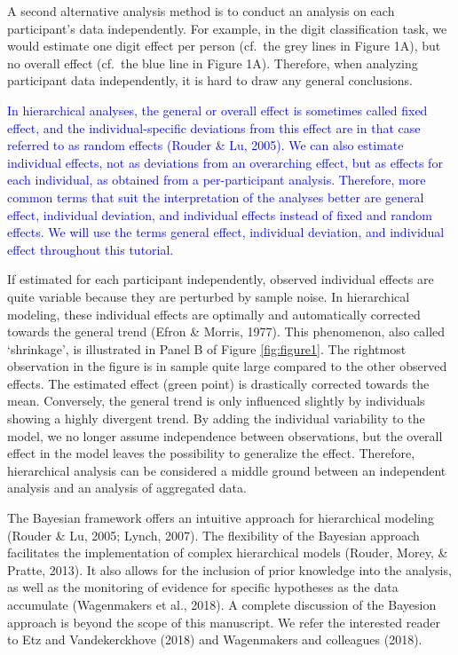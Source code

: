 \documentclass[
  english,
  doc,floatsintext]{apa6}
\begin{document}
A second alternative analysis method is to conduct an analysis on each participant's data independently. For example, in the digit classification task, we would estimate one digit effect per person (cf.~the grey lines in Figure 1A), but no overall effect (cf.~the blue line in Figure 1A). Therefore, when analyzing participant data independently, it is hard to draw any general conclusions.

\textcolor{blue}{In hierarchical analyses, the general or overall effect is sometimes called fixed effect, and the individual-specific deviations from this effect are in that case referred to as random effects (Rouder \& Lu, 2005). We can also estimate individual effects, not as deviations from an overarching effect, but as effects for each individual, as obtained from a per-participant analysis. Therefore, more common terms that suit the interpretation of the analyses better are general effect, individual deviation, and individual effects instead of fixed and random effects. We will use the terms general effect, individual deviation, and individual effect throughout this tutorial.}

If estimated for each participant independently, observed individual effects are quite variable because they are perturbed by sample noise. In hierarchical modeling, these individual effects are optimally and automatically corrected towards the general trend (Efron \& Morris, 1977). This phenomenon, also called `shrinkage', is illustrated in Panel B of Figure \ref{fig:figure1}. The rightmost observation in the figure is in sample quite large compared to the other observed effects. The estimated effect (green point) is drastically corrected towards the mean. Conversely, the general trend is only influenced slightly by individuals showing a highly divergent trend. By adding the individual variability to the model, we no longer assume independence between observations, but the overall effect in the model leaves the possibility to generalize the effect. Therefore, hierarchical analysis can be considered a middle ground between an independent analysis and an analysis of aggregated data.

The Bayesian framework offers an intuitive approach for hierarchical modeling (Rouder \& Lu, 2005; Lynch, 2007). The flexibility of the Bayesian approach facilitates the implementation of complex hierarchical models (Rouder, Morey, \& Pratte, 2013). It also allows for the inclusion of prior knowledge into the analysis, as well as the monitoring of evidence for specific hypotheses as the data accumulate (Wagenmakers et al., 2018). A complete discussion of the Bayesion approach is beyond the scope of this manuscript. We refer the interested reader to Etz and Vandekerckhove (2018) and Wagenmakers and colleagues (2018).
\end{document}
